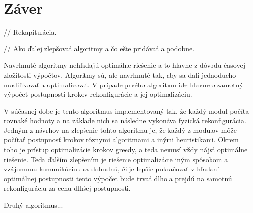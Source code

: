 \documentclass[
  digital, %
  oneside, %
  table,   %
  lof,     %
  nolot,     %
]{fithesis3}
\begin{document}
\chapter{Záver}
\label{sec:future}
// Rekapitulácia. 

// Ako ďalej zlepšovať algoritmy a čo ešte pridávať a podobne. 

Navrhnuté algoritmy nehľadajú optimálne riešenie a to hlavne z dôvodu časovej zložitosti výpočtov. Algoritmy sú, ale navrhnuté tak, aby sa dali jednoducho modifikovať a optimalizovať. V prípade prvého algoritmu ide hlavne o samotný výpočet postupnosti krokov rekonfigurácie a jej optimalizáciu. 

V súčasnej dobe je tento algoritmus implementovaný tak, že každý modul počíta rovnaké hodnoty a na základe nich sa následne vykonáva fyzická rekonfigurácia. Jedným z návrhov na zlepšenie tohto algoritmu je, že každý z modulov môže počítať postupnosť krokov rôznymi algoritmami a inými heuristikami. Okrem toho je prístup optimalizácie krokov greedy, a teda nemusí vždy nájsť optimálne riešenie. Teda ďalším zlepšením je riešenie optimalizácie iným spôsobom a vzájomnou komunikáciou sa dohodnú, či je lepšie pokračovať v hľadaní optimálnej postupnosti tento výpočet bude trvať dlho a prejdú na samotnú rekonfiguráciu za cenu dlhšej postupnosti. 

Druhý algoritmus...


\printbibliography[heading=bibintoc] %
\end{document}
